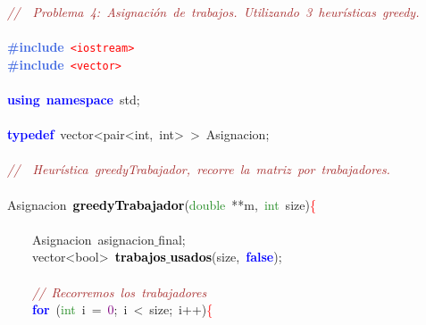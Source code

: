 \noindent
\mbox{}\textit{\textcolor{Brown}{//\ \ Problema\ 4:\ Asignación\ de\ trabajos.\ Utilizando\ 3\ heurísticas\ greedy.\ }} \\
\mbox{} \\
\mbox{}\textbf{\textcolor{RoyalBlue}{\#include}}\ \texttt{\textcolor{Red}{\textless{}iostream\textgreater{}}} \\
\mbox{}\textbf{\textcolor{RoyalBlue}{\#include}}\ \texttt{\textcolor{Red}{\textless{}vector\textgreater{}}} \\
\mbox{} \\
\mbox{}\textbf{\textcolor{Blue}{using}}\ \textbf{\textcolor{Blue}{namespace}}\ std\textcolor{BrickRed}{;} \\
\mbox{} \\
\mbox{}\textbf{\textcolor{Blue}{typedef}}\ \textcolor{TealBlue}{vector\textless{}pair\textless{}int,\ int\textgreater{}\ \textgreater{}}\ Asignacion\textcolor{BrickRed}{;} \\
\mbox{} \\
\mbox{}\textit{\textcolor{Brown}{//\ \ Heurística\ greedyTrabajador,\ recorre\ la\ matriz\ por\ trabajadores.\ }} \\
\mbox{} \\
\mbox{}\textcolor{TealBlue}{Asignacion}\ \textbf{\textcolor{Black}{greedyTrabajador}}\textcolor{BrickRed}{(}\textcolor{ForestGreen}{double}\ \textcolor{BrickRed}{**}m\textcolor{BrickRed}{,}\ \textcolor{ForestGreen}{int}\ size\textcolor{BrickRed}{)}\textcolor{Red}{\{} \\
\mbox{}\ \ \ \  \\
\mbox{}\ \ \ \ \textcolor{TealBlue}{Asignacion}\ asignacion$\_$final\textcolor{BrickRed}{;}\  \\
\mbox{}\ \ \ \ \textcolor{TealBlue}{vector\textless{}bool\textgreater{}}\ \textbf{\textcolor{Black}{trabajos$\_$usados}}\textcolor{BrickRed}{(}size\textcolor{BrickRed}{,}\ \textbf{\textcolor{Blue}{false}}\textcolor{BrickRed}{);}\ \  \\
\mbox{}\ \ \ \  \\
\mbox{}\ \ \ \ \textit{\textcolor{Brown}{//\ Recorremos\ los\ trabajadores}} \\
\mbox{}\ \ \ \ \textbf{\textcolor{Blue}{for}}\ \textcolor{BrickRed}{(}\textcolor{ForestGreen}{int}\ i\ \textcolor{BrickRed}{=}\ \textcolor{Purple}{0}\textcolor{BrickRed}{;}\ i\ \textcolor{BrickRed}{\textless{}}\ size\textcolor{BrickRed}{;}\ i\textcolor{BrickRed}{++)}\textcolor{Red}{\{} \\
